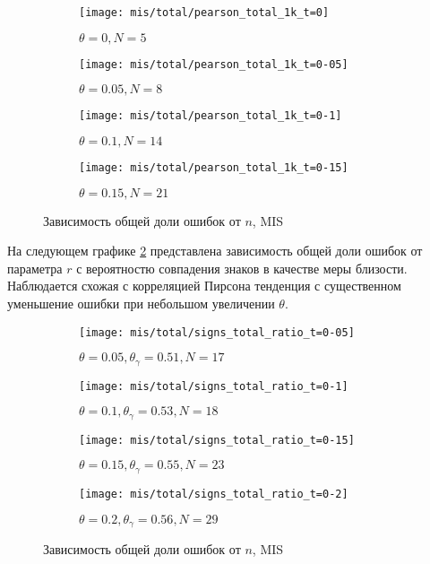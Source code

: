 \begin{figure}[H]
     \centering
     \begin{subfigure}[b]{0.49\textwidth}
         \centering
         \texttt{[image: mis/total/pearson\_total\_1k\_t=0]}
         \caption{$\theta=0, N=5$}
     \end{subfigure}
     \hfill
     \begin{subfigure}[b]{0.49\textwidth}
         \centering
         \texttt{[image: mis/total/pearson\_total\_1k\_t=0-05]}
         \caption{$\theta=0.05, N=8$}
     \end{subfigure}
     \vfill
     \begin{subfigure}[b]{0.49\textwidth}
         \centering
         \texttt{[image: mis/total/pearson\_total\_1k\_t=0-1]}
         \caption{$\theta=0.1, N=14$}
     \end{subfigure}
     \hfill
     \begin{subfigure}[b]{0.49\textwidth}
         \centering
         \texttt{[image: mis/total/pearson\_total\_1k\_t=0-15]}
         \caption{$\theta=0.15, N=21$}
     \end{subfigure}
    
        \caption{Зависимость общей доли ошибок от $n$,  MIS}
        \label{fig:exp/mis/total_1k}
\end{figure}  


На следующем графике \ref{fig:exp/mis/signs_ratio} представлена зависимость общей доли ошибок от параметра $r$ с вероятностю совпадения знаков в качестве меры близости. Наблюдается схожая с корреляцией Пирсона тенденция с существенном уменьшение ошибки при небольшом увеличении $\theta$. 

\begin{figure}[H]
     \centering
     \begin{subfigure}[b]{0.49\textwidth}
         \centering
         \texttt{[image: mis/total/signs\_total\_ratio\_t=0-05]}
         \caption{$\theta=0.05, \theta_\gamma=0.51, N=17$}
     \end{subfigure}
     \hfill
     \begin{subfigure}[b]{0.49\textwidth}
         \centering
         \texttt{[image: mis/total/signs\_total\_ratio\_t=0-1]}
         \caption{$\theta=0.1, \theta_\gamma=0.53, N=18$}
     \end{subfigure}
     \vfill
     \begin{subfigure}[b]{0.49\textwidth}
         \centering
         \texttt{[image: mis/total/signs\_total\_ratio\_t=0-15]}
         \caption{$\theta=0.15, \theta_\gamma=0.55, N=23$}
     \end{subfigure}
     \hfill
     \begin{subfigure}[b]{0.49\textwidth}
         \centering
         \texttt{[image: mis/total/signs\_total\_ratio\_t=0-2]}
         \caption{$\theta=0.2, \theta_\gamma=0.56, N=29$}
     \end{subfigure}
    
        \caption{Зависимость общей доли ошибок от $n$,  MIS}
        \label{fig:exp/mis/signs_ratio}
\end{figure}  

